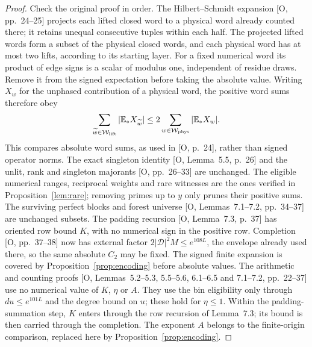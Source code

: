 \documentclass[11pt]{article}
\theoremstyle{definition}
\newcommand{\E}{\mathbb E}
\theoremstyle{remark}
\numberwithin{equation}{section}
\newcommand{\Dset}{\mathcal D}
\begin{document}
\begin{proof}
Check the original proof in order. The Hilbert--Schmidt expansion [O, pp.~24--25] projects each lifted closed
word to a physical word already counted there; it retains unequal consecutive tuples within each half.
The projected lifted words form a subset of the physical closed words, and each physical word has at most two
lifts, according to its starting layer. For a fixed numerical word its product of edge signs is a scalar of
modulus one, independent of residue draws. Remove it from the signed expectation before taking the absolute
value. Writing $X_w$ for the unphased contribution of a physical word, the positive word sums therefore obey
\begin{equation}\label{eq:phase-word-domination}
 \sum_{\widetilde w\in\mathcal W_{\rm lift}}|\E_*X_{\widetilde w}|
 \le2\sum_{w\in\mathcal W_{\rm phys}}|\E_*X_w|.
\end{equation}
This compares absolute word sums, as used in [O, p.~24], rather than signed operator norms.
The exact singleton identity [O, Lemma~5.5, p.~26] and the unlit, rank and singleton majorants
[O, pp.~26--33] are unchanged. The eligible numerical ranges, reciprocal weights and rare witnesses are the
ones verified in Proposition~\ref{lem:rare}; removing primes up to $y$ only prunes their positive sums.
The surviving perfect blocks and forest universe [O, Lemmas~7.1--7.2, pp.~34--37] are unchanged subsets.
The padding recursion [O, Lemma~7.3, p.~37] has oriented row bound $K$, with no numerical sign in the positive
row. Completion [O, pp.~37--38] now has external factor $2|\Dset|^2M\le e^{108L}$, the envelope already used
there, so the same absolute $C_2$ may be fixed. The signed finite expansion is covered by
Proposition~\ref{prop:encoding} before absolute values.
The arithmetic and counting proofs [O, Lemmas~5.2--5.3, 5.5--5.6, 6.1--6.5 and 7.1--7.2, pp.~22--37] use no
numerical value of $K$, $\eta$ or $A$. They use the bin eligibility only through $du\le e^{101L}$ and the degree
bound on $u$; these hold for $\eta\le1$. Within the padding-summation step, $K$ enters through the row recursion
of Lemma~7.3; its bound is then carried through the completion. The exponent $A$ belongs to the finite-origin
comparison, replaced here by Proposition~\ref{prop:encoding}.


\end{proof}
\end{document}
